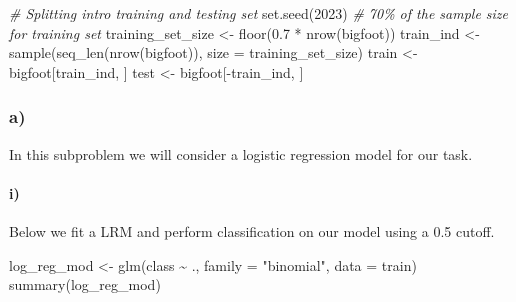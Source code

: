 \documentclass[
]{article}
\newenvironment{Shaded}{\begin{snugshade}}{\end{snugshade}}
\newcommand{\AttributeTok}[1]{\textcolor[rgb]{0.77,0.63,0.00}{#1}}
\newcommand{\CommentTok}[1]{\textcolor[rgb]{0.56,0.35,0.01}{\textit{#1}}}
\newcommand{\DecValTok}[1]{\textcolor[rgb]{0.00,0.00,0.81}{#1}}
\newcommand{\FloatTok}[1]{\textcolor[rgb]{0.00,0.00,0.81}{#1}}
\newcommand{\FunctionTok}[1]{\textcolor[rgb]{0.00,0.00,0.00}{#1}}
\newcommand{\NormalTok}[1]{#1}
\newcommand{\OtherTok}[1]{\textcolor[rgb]{0.56,0.35,0.01}{#1}}
\newcommand{\SpecialCharTok}[1]{\textcolor[rgb]{0.00,0.00,0.00}{#1}}
\newcommand{\StringTok}[1]{\textcolor[rgb]{0.31,0.60,0.02}{#1}}
\begin{document}
\begin{Shaded}
\begin{Highlighting}[]
\CommentTok{\# Splitting intro training and testing set}
\FunctionTok{set.seed}\NormalTok{(}\DecValTok{2023}\NormalTok{)}
\CommentTok{\# 70\% of the sample size for training set}
\NormalTok{training\_set\_size }\OtherTok{\textless{}{-}} \FunctionTok{floor}\NormalTok{(}\FloatTok{0.7} \SpecialCharTok{*} \FunctionTok{nrow}\NormalTok{(bigfoot))}
\NormalTok{train\_ind }\OtherTok{\textless{}{-}} \FunctionTok{sample}\NormalTok{(}\FunctionTok{seq\_len}\NormalTok{(}\FunctionTok{nrow}\NormalTok{(bigfoot)), }\AttributeTok{size =}\NormalTok{ training\_set\_size)}
\NormalTok{train }\OtherTok{\textless{}{-}}\NormalTok{ bigfoot[train\_ind, ]}
\NormalTok{test }\OtherTok{\textless{}{-}}\NormalTok{ bigfoot[}\SpecialCharTok{{-}}\NormalTok{train\_ind, ]}
\end{Highlighting}
\end{Shaded}

\hypertarget{a-2}{%
\subsubsection{a)}\label{a-2}}

In this subproblem we will consider a logistic regression model for our
task.

\hypertarget{i-3}{%
\paragraph{i)}\label{i-3}}

Below we fit a LRM and perform classification on our model using a 0.5
cutoff.

\begin{Shaded}
\begin{Highlighting}[]
\NormalTok{log\_reg\_mod }\OtherTok{\textless{}{-}} \FunctionTok{glm}\NormalTok{(class }\SpecialCharTok{\textasciitilde{}}\NormalTok{ ., }\AttributeTok{family =} \StringTok{"binomial"}\NormalTok{, }\AttributeTok{data =}\NormalTok{ train)}
\FunctionTok{summary}\NormalTok{(log\_reg\_mod)}
\end{Highlighting}
\end{Shaded}
\end{document}
